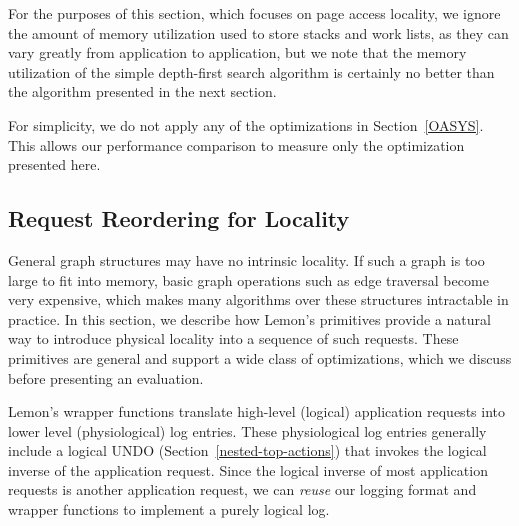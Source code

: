 \documentclass[10pt,letterpaper,twocolumn,english]{article}
\newcommand{\yad}{Lemon\xspace}
\begin{document}
For the purposes of this section, which focuses on page access
locality, we ignore the amount of memory utilization used to store
stacks and work lists, as they can vary greatly from application to
application, but we note that the memory utilization of the simple
depth-first search algorithm is certainly no better than the algorithm
presented in the next section.

For simplicity, we do not apply any of the optimizations in
Section~\ref{OASYS}.  This allows our performance comparison to
 measure only the optimization presented here.

\subsection {Request Reordering for Locality}

General graph structures may have no intrinsic locality.  If such a
graph is too large to fit into memory, basic graph operations such as
edge traversal become very expensive, which makes many algorithms over
these structures intractable in practice.  In this section, we
describe how \yad's primitives provide a natural way to introduce
physical locality into a sequence of such requests.  These primitives
are general and support a wide class of optimizations, which we discuss
before presenting an evaluation.

\yad's wrapper functions translate high-level (logical) application
requests into lower level (physiological) log entries.  These
physiological log entries generally include a logical UNDO
(Section~\ref{nested-top-actions}) that invokes the logical
inverse of the application request.  Since the logical inverse of most
application requests is another application request, we can {\em reuse} our
logging format and wrapper functions to implement a purely logical log.
\end{document}
